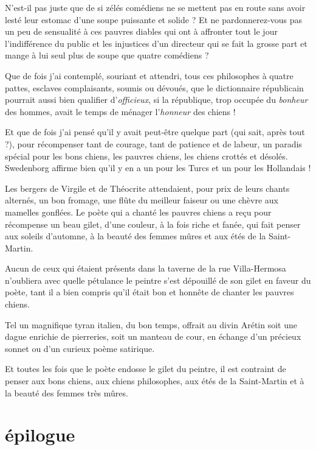 N’est{}-il pas juste que de si zélés comédiens ne se
mettent pas en route sans avoir lesté leur estomac
d’une soupe puissante et solide ? Et ne
pardonnerez{}-vous pas un peu de sensualité à ces pauvres diables qui
ont à affronter tout le jour l’indifférence du public
et les injustices d’un directeur qui se fait la grosse
part et mange à lui seul plus de soupe que quatre comédiens ?

Que de fois j’ai contemplé, souriant et attendri, tous
ces philosophes à quatre pattes, esclaves complaisants, soumis ou
dévoués, que le dictionnaire républicain pourrait aussi bien qualifier
d’\textit{officieux}, si la république, trop occupée du \textit{bonheur}
des hommes, avait le temps de ménager l’\textit{honneur} des
chiens !

Et que de fois j’ai pensé qu’il y
avait peut{}-être quelque part (qui sait, après tout ?), pour
récompenser tant de courage, tant de patience et de labeur, un paradis
spécial pour les bons chiens, les pauvres chiens, les chiens crottés et
désolés. Swedenborg affirme bien qu’il y en a un pour
les Turcs et un pour les Hollandais !

Les bergers de Virgile et de Théocrite attendaient, pour prix de leurs
chants alternés, un bon fromage, une flûte du meilleur faiseur ou une
chèvre aux mamelles gonflées. Le poète qui a chanté les pauvres chiens
a reçu pour récompense un beau gilet, d’une couleur, à
la fois riche et fanée, qui fait penser aux soleils
d’automne, à la beauté des femmes mûres et aux étés de
la Saint{}-Martin.

Aucun de ceux qui étaient présents dans la taverne de la rue
Villa{}-Hermosa n’oubliera avec quelle pétulance le
peintre s’est dépouillé de son gilet en faveur du
poète, tant il a bien compris qu’il était bon et
honnête de chanter les pauvres chiens.

Tel un magnifique tyran italien, du bon temps, offrait au divin Arétin
soit une dague enrichie de pierreries, soit un manteau de cour, en
échange d’un précieux sonnet ou d’un
curieux poème satirique.

Et toutes les fois que le poète endosse le gilet du peintre, il est
contraint de penser aux bons chiens, aux chiens philosophes, aux étés
de la Saint{}-Martin et à la beauté des femmes très mûres.

\quebra\section[Épilogue]{épilogue}

